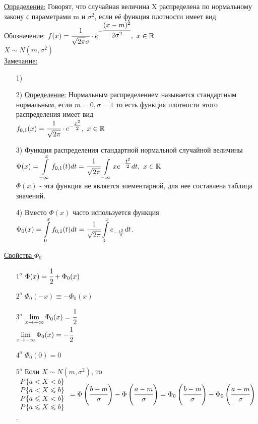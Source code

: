 
\underline{Определение:} Говорят, что случайная величина X распределена по нормальному закону с параметрами m и $\sigma^2$, если её функция плотности имеет вид \\
Обозначение: $f(x) = \cfrac{1}{\sqrt{2\pi} \sigma} \cdot e^{- \cfrac{(x-m)^2}{2 \sigma^2}}, \ x \in \mathbb{R}$ \\
$X \sim N(m, \sigma^2)$ \\

\underline{Замечание:} 
\begin{enumerate}
	\item[1)]
	
	\item[2)] \underline{Определение:} Нормальным распределением называется стандартным нормальным, если $m = 0, \sigma = 1$ то есть функция плотности этого распределения имеет вид \\
	$f_{0,1} (x) = \cfrac{1}{\sqrt{2\pi}} \cdot e^{- \tfrac{x^2}{2}}, \ x \in \mathbb{R}$
	
	\item[3)] Функция распределения стандартной нормальной случайной величины \\
	$\displaystyle  \Phi(x) = \int\limits_{-\infty}^{x} f_{0,1} (t)dt = \cfrac{1}{\sqrt{2\pi}} \int\limits_{-\infty}{x} e^{- \tfrac{t^2}{2}} dt, \ x \in \mathbb{R}$ \\
	$\Phi(x)$ - эта функция не является элементарной, для нее составлена таблица значений. 
	
	\item[4)] Вместо $\Phi(x)$ часто используется функция \\
	$\displaystyle  \Phi_0(x) = \int\limits_{0}^{x} f_{0,1} (t)dt = \cfrac{1}{\sqrt{2\pi}} \int\limits_{0}^{x} e_{- \frac{t^2}{2}} dt$. \\
\end{enumerate}


\underline{Свойства $\Phi_0$} \\
\begin{enumerate}
	\item[$1^o$] $\Phi(x) = \cfrac12 + \Phi_0(x)$ 
	\item[$2^o$] $\Phi_0(-x) \equiv - \Phi_0(x)$ 
	\item[$3^o$] $\lim\limits_{x \to + \infty} \Phi_0(x) = \cfrac12$ \\
	$\lim\limits_{x \to - \infty} \Phi_0(x) = - \cfrac12$ 
	\item[$4^o$] $\Phi_0(0) = 0$ 
	\item[$5^o$] Если $X \sim N(m, \sigma^2)$, то $
	\begin{array}{lll}
		P\{a < X < b\} \\
		P\{a < X \leqslant b\} \\
		P\{a \leqslant X < b\} \\
		P\{a \leqslant X \leqslant b\} \\
	\end{array}= \Phi \left(\cfrac{b - m}{\sigma}\right) - \Phi \left(\cfrac{a - m}{\sigma}\right) = \Phi_0 \left(\cfrac{b - m}{\sigma}\right) - \Phi_0 \left(\cfrac{a - m}{\sigma}\right)$.
\end{enumerate}


